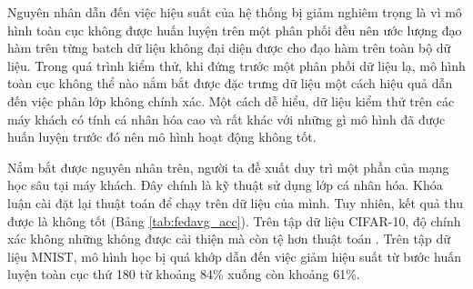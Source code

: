 Nguyên nhân dẫn đến việc hiệu suất của hệ thống bị giảm nghiêm trọng là vì mô hình toàn cục không được huấn luyện trên một phân phối đều nên ước lượng đạo hàm trên từng batch dữ liệu không đại diện được cho đạo hàm trên toàn bộ dữ liệu. Trong quá trình kiểm thử, khi đứng trước một phân phối dữ liệu lạ, mô hình toàn cục không thể nào nắm bắt được đặc trưng dữ liệu một cách hiệu quả dẫn đến việc phân lớp không chính xác. Một cách dễ hiểu, dữ liệu kiểm thử trên các máy khách có tính cá nhân hóa cao và rất khác với những gì mô hình đã được huấn luyện trước đó nên mô hình hoạt động không tốt.

Nắm bắt được nguyên nhân trên, người ta đề xuất duy trì một phần của mạng học sâu tại máy khách. Đây chính là kỹ thuật sử dụng lớp cá nhân hóa. Khóa luận cài đặt lại thuật toán  để chạy trên dữ liệu của mình. Tuy nhiên, kết quả thu được là không tốt (Bảng \ref{tab:fedavg_acc}). Trên tập dữ liệu CIFAR-10, độ chính xác không những không được cải thiện mà còn tệ hơn thuật toán . Trên tập dữ liệu MNIST, mô hình học bị quá khớp dẫn đến việc giảm hiệu suất từ bước huấn luyện toàn cục thứ 180 từ khoảng 84\% xuống còn khoảng 61\%.

\begin{table}[H]
    \centering
    \caption{Bảng độ chính xác (\%) của thuật toán FedAvg, FedAvgMeta, FedPerMeta tính trên điểm dữ liệu (dữ liệu IID và Non-IID)}
    \label{tab:fedavg_acc}
\end{table}

